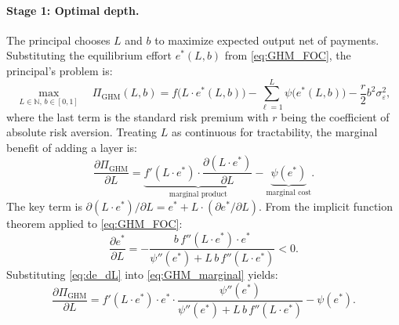 \paragraph{Stage 1: Optimal depth.} The principal chooses $L$ and $b$ to maximize expected output net of payments. Substituting the equilibrium effort $e^*(L, b)$ from \eqref{eq:GHM_FOC}, the principal's problem is:
\begin{equation}
\label{eq:GHM_principal}
\max_{L \in \mathbb{N},\, b \in [0,1]} \quad \Pi_{\text{GHM}}(L, b) = f\bigl(L \cdot e^*(L, b)\bigr) - \sum_{\ell=1}^{L} \psi\bigl(e^*(L, b)\bigr) - \frac{r}{2} b^2 \sigma_\varepsilon^2,
\end{equation}
where the last term is the standard risk premium with $r$ being the coefficient of absolute risk aversion. Treating $L$ as continuous for tractability, the marginal benefit of adding a layer is:
\begin{equation}
\label{eq:GHM_marginal}
\frac{\partial \Pi_{\text{GHM}}}{\partial L} = \underbrace{f'(L \cdot e^*) \cdot \frac{\partial (L \cdot e^*)}{\partial L}}_{\text{marginal product}} - \underbrace{\psi(e^*)}_{\text{marginal cost}}.
\end{equation}
The key term is $\partial(L \cdot e^*)/\partial L = e^* + L \cdot (\partial e^*/\partial L)$. From the implicit function theorem applied to \eqref{eq:GHM_FOC}:
\begin{equation}
\label{eq:de_dL}
\frac{\partial e^*}{\partial L} = -\frac{b \, f''(L \cdot e^*) \cdot e^*}{\psi''(e^*) + L \, b \, f''(L \cdot e^*)} < 0.
\end{equation}
Substituting \eqref{eq:de_dL} into \eqref{eq:GHM_marginal} yields:
\begin{equation}
\label{eq:GHM_marginal_simplified}
\frac{\partial \Pi_{\text{GHM}}}{\partial L} = f'(L \cdot e^*) \cdot e^* \cdot \frac{\psi''(e^*)}{\psi''(e^*) + L \, b \, f''(L \cdot e^*)} - \psi(e^*).
\end{equation}

